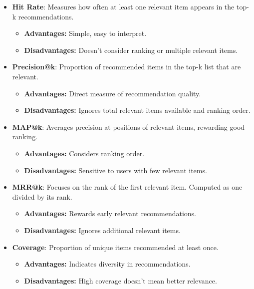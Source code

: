 \documentclass[11pt,a4paper]{article}
\begin{document}
\begin{itemize}
    \item \textbf{Hit Rate}: Measures how often at least one relevant item appears in the top-k recommendations.
    \begin{itemize}
        \item \textbf{Advantages:} Simple, easy to interpret.
        \item \textbf{Disadvantages:} Doesn't consider ranking or multiple relevant items.
    \end{itemize}

    \item \textbf{Precision@k}: Proportion of recommended items in the top-k list that are relevant.
    \begin{itemize}
        \item \textbf{Advantages:} Direct measure of recommendation quality.
        \item \textbf{Disadvantages:} Ignores total relevant items available and ranking order.
    \end{itemize}

    \item \textbf{MAP@k}: Averages precision at positions of relevant items, rewarding good ranking.
    \begin{itemize}
        \item \textbf{Advantages:} Considers ranking order.
        \item \textbf{Disadvantages:} Sensitive to users with few relevant items.
    \end{itemize}

    \item \textbf{MRR@k}: Focuses on the rank of the first relevant item. Computed as one divided by its rank.
    \begin{itemize}
        \item \textbf{Advantages:} Rewards early relevant recommendations.
        \item \textbf{Disadvantages:} Ignores additional relevant items.
    \end{itemize}

    \item \textbf{Coverage}: Proportion of unique items recommended at least once.
    \begin{itemize}
        \item \textbf{Advantages:} Indicates diversity in recommendations.
        \item \textbf{Disadvantages:} High coverage doesn’t mean better relevance.
    \end{itemize}
\end{itemize}
\end{document}

